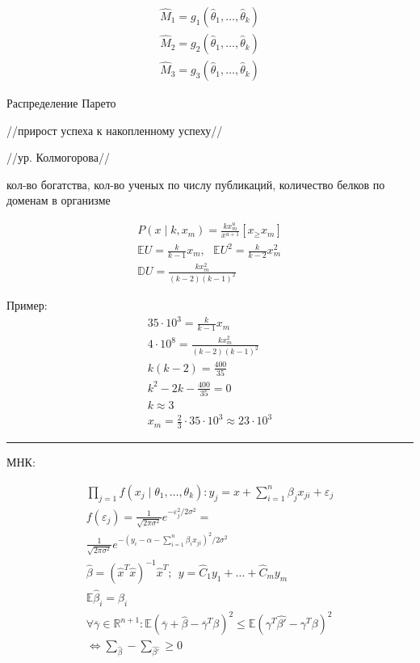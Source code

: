 \documentclass{book}
\begin{document}
\begin{gather*}
  \hat{M}_1=g_1(\hat{\theta}_1,\dots,\hat{\theta}_k)\\
  \hat{M}_2=g_2(\hat{\theta}_1,\dots,\hat{\theta}_k)\\
  \hat{M}_3=g_3(\hat{\theta}_1,\dots,\hat{\theta}_k)
\end{gather*}

Распределение Парето

//прирост успеха к накопленному успеху//

//ур. Колмогорова//

кол-во богатства, кол-во ученых по числу публикаций, количество белков по доменам в организме

\begin{gather*}
  P(x\mid k, x_m) = \frac{kx^u_m}{x^{u+1}}[x_\geq x_m]\\
  \mathbb{E}U = \frac{k}{k-1}x_m, ~~~ \mathbb{E}U^2=\frac{k}{k-2}x_m^2\\
  \mathbb{D}U = \frac{kx_m^2}{(k-2)(k-1)^2}
\end{gather*}

Пример:
\begin{gather*}
    35\cdot 10^3=\frac{k}{k-1}x_m\\
    4\cdot 10^8=\frac{kx_m^2}{(k-2)(k-1)^2}\\
    k(k-2)=\frac{400}{35}\\
    k^2-2k-\frac{400}{35}=0\\
    k\approx 3\\
    x_m = \frac{2}{3}\cdot 35\cdot 10^3 \approx 23 \cdot 10^3
\end{gather*}

\hrule
МНК:

\begin{gather*}
    \prod_{j=1}^{} {f(x_j\mid \theta_1,\dots, \theta_k)}: y_j=x+\sum_{i=1}^{n} {\beta_j x_{ji}}+\varepsilon_j\\
  f(\varepsilon_j)=\frac{1}{\sqrt{2\pi\sigma^2}}e^{-\varepsilon_j^2/2\sigma^2}=\\
  \frac{1}{\sqrt{2\pi\sigma^2}}e^{-(y_i-\alpha-\sum_{i=1}^{n} {\beta_i x_{ji}})^2/2\sigma^2}\\
  \hat{\beta}=(\hat{x}^T\hat{x})^{-1}\hat{x}^T;~~
  y=\hat{C}_1 y_1+\dots+\hat{C}_m y_m\\
  \mathbb{E}\hat{\beta}_i=\beta_i\\
  \forall \overline{\gamma} \in \mathbb{R}^{n+1}:
  \mathbb{E}(\overline{\gamma}+\hat{\beta}-\overline{\gamma}^T\beta)^2\leq
  \mathbb{E}(\gamma^T \hat{\beta'}-\gamma^T\beta)^2\\
  \Leftrightarrow \sum_{\hat{\beta}} - \sum_{\hat{\beta'}} \geq 0
\end{gather*}
\end{document}
